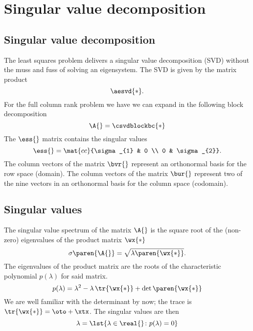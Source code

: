 \section{\label{sec:bevington svd}Singular value decomposition}

\subsection{Singular value decomposition}
The least squares problem delivers a singular value decomposition (SVD) without the muss and fuss of solving an eigensystem. The SVD is given by the matrix product
  \begin{equation}
    \aesvd{*}.
  \end{equation}
For the full column rank problem we have we can expand in the following block decomposition
  \begin{equation}
    \A{} = \csvdblockbc{*}
    \label{eqn:ls block}
  \end{equation}
The $\ess{}$ matrix contains the singular values
  \begin{equation}
    \ess{} = \mat{cc}{\sigma_{1} & 0 \\ 0 & \sigma_{2}}.
  \end{equation}
The column vectors of the matrix $\bvr{}$ represent an orthonormal basis for the row space (domain). The column vectors of the matrix $\bur{}$ represent two of the nine vectors in an orthonormal basis for the column space (codomain).

\subsection{Singular values}
The singular value spectrum of the matrix $\A{}$ is the square root of the (non-zero) eigenvalues of the product matrix $\wx{*}$
  \begin{equation}
    \sigma \paren{\A{}} = \sqrt{\lambda\paren{\wx{*}}}.
  \end{equation}
The eigenvalues of the product matrix are the roots of the characteristic polynomial $p(\lambda)$ for said matrix.
  \begin{equation}
    p(\lambda) = \lambda^{2} - \lambda \, \tr{\wx{*}} + \det\paren{\wx{*}}
  \end{equation}
We are well familiar with the determinant by now; the trace is  $\tr{\wx{*}}=\oto+\xtx$. The singular values are then
\begin{equation}
    \lambda = \lst { \lambda \in \real{} \colon p(\lambda) = 0}
\end{equation}

